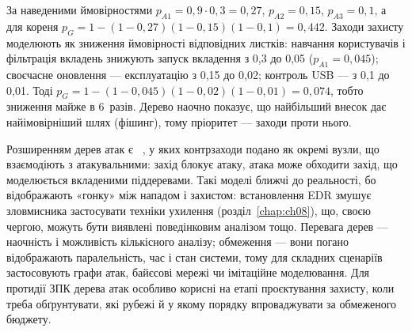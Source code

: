 \begin{tikzfig}
\end{tikzfig}

За наведеними ймовірностями $p_{A1} = 0{,}9\cdot0{,}3 = 0{,}27$, $p_{A2} = 0{,}15$, $p_{A3} = 0{,}1$, а для кореня $p_G = 1-(1-0{,}27)(1-0{,}15)(1-0{,}1) = 0{,}442$. Заходи захисту моделюють як зниження ймовірності відповідних листків: навчання користувачів і фільтрація вкладень знижують запуск вкладення з 0,3 до 0,05 ($p_{A1}=0{,}045$); своєчасне оновлення --- експлуатацію з 0,15 до 0,02; контроль USB --- з 0,1 до 0,01. Тоді $p_G = 1-(1-0{,}045)(1-0{,}02)(1-0{,}01) = 0{,}074$, тобто зниження майже в 6~разів. Дерево наочно показує, що найбільший внесок дає найімовірніший шлях (фішинг), тому пріоритет --- заходи проти нього.

Розширенням дерев атак є ~\cite{ch04:kordy}, у яких контрзаходи подано як окремі вузли, що взаємодіють з атакувальними: захід блокує атаку, атака може обходити захід, що моделюється вкладеними піддеревами. Такі моделі ближчі до реальності, бо відображають «гонку» між нападом і захистом: встановлення EDR змушує зловмисника застосувати техніки ухилення (розділ~\ref{chap:ch08}), що, своєю чергою, можуть бути виявлені поведінковим аналізом тощо. Перевага дерев --- наочність і можливість кількісного аналізу; обмеження --- вони погано відображають паралельність, час і стан системи, тому для складних сценаріїв застосовують графи атак, байєсові мережі чи імітаційне моделювання. Для протидії ЗПК дерева атак особливо корисні на етапі проєктування захисту, коли треба обґрунтувати, які рубежі й у якому порядку впроваджувати за обмеженого бюджету.


